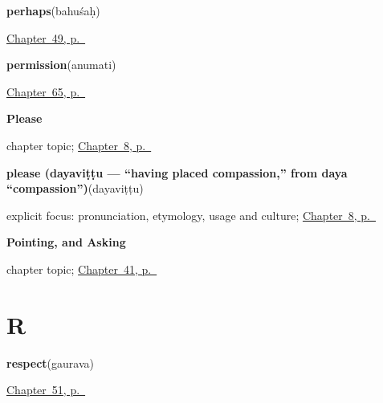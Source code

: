 \noindent\begin{minipage}[t]{\linewidth}
\raggedright
\textbf{perhaps}\enspace\emph{}\enspace(bahuśaḥ)\par
\footnotesize \hyperref[ch:ka-replies]{Chapter~49, p.~\pageref*{ch:ka-replies}}
\end{minipage}\par\smallskip

\noindent\begin{minipage}[t]{\linewidth}
\raggedright
\textbf{permission}\enspace\emph{}\enspace(anumati)\par
\footnotesize \hyperref[ch:ka-manners]{Chapter~65, p.~\pageref*{ch:ka-manners}}
\end{minipage}\par\smallskip

\noindent\begin{minipage}[t]{\linewidth}
\raggedright
\textbf{Please}\par
\footnotesize chapter topic; \hyperref[ch:ka-please]{Chapter~8, p.~\pageref*{ch:ka-please}}
\end{minipage}\par\smallskip

\noindent\begin{minipage}[t]{\linewidth}
\raggedright
\textbf{please (dayaviṭṭu — \textquotedblleft{}having placed compassion,\textquotedblright{} from  daya \textquotedblleft{}compassion\textquotedblright{})}\enspace\emph{}\enspace(dayaviṭṭu)\par
\footnotesize explicit focus: pronunciation, etymology, usage and culture; \hyperref[ch:ka-please]{Chapter~8, p.~\pageref*{ch:ka-please}}
\end{minipage}\par\smallskip

\noindent\begin{minipage}[t]{\linewidth}
\raggedright
\textbf{Pointing, and Asking}\par
\footnotesize chapter topic; \hyperref[ch:kn-pointing-and-asking]{Chapter~41, p.~\pageref*{ch:kn-pointing-and-asking}}
\end{minipage}\par\smallskip

\section*{R}

\noindent\begin{minipage}[t]{\linewidth}
\raggedright
\textbf{respect}\enspace\emph{}\enspace(gaurava)\par
\footnotesize \hyperref[ch:ka-courtesy]{Chapter~51, p.~\pageref*{ch:ka-courtesy}}
\end{minipage}\par\smallskip

